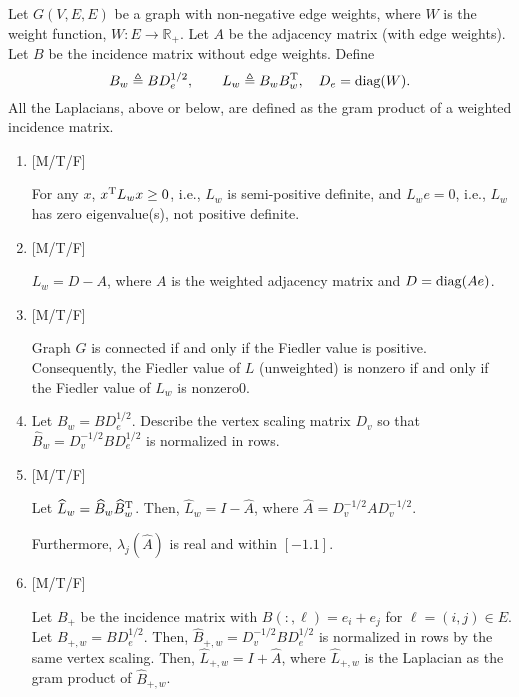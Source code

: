 \begin{enumerate}
     Let $G(V,E,E)$ be a graph with non-negative edge weights, where
     $W$ is the weight function, $W:E\to \mathbb{R}_{+}$.  Let $A$ be
     the adjacency matrix (with edge weights).  Let $B$ be the
     incidence matrix without edge weights.  Define
     \begin{equation}
       B_{w} \triangleq B D_{e}^{1/2},
       \qquad 
       L_{w} \triangleq B_{w} B_{w}^{\rm T},
       \quad 
       D_{e} = \mbox{diag}(W).
     \end{equation} 
     All the Laplacians, above or below, are defined as the gram
     product of a weighted incidence matrix.
     
     \begin{enumerate}
     \item { [M/T/F] }

       For any $x$, $x^{\rm T}L_{w}x\geq 0$, i.e., $L_{w}$ is
       semi-positive definite, and $L_{w}e=0$, i.e., $L_{w}$ has zero
       eigenvalue(s), not positive definite.
       

     \item { [M/T/F] }

       $L_{w} = D-A$, where
         $A$ is the weighted adjacency matrix and $D=\mbox{\rm
        diag}(Ae)$.

     
     \item { [M/T/F] }

       Graph $G$ is connected if and only if the Fiedler value is positive.
       Consequently, the Fiedler value of $L$ (unweighted) is nonzero
       if and only if the Fiedler value of $L_{w}$ is nonzero0.

     \item Let $B_{w} = BD_{e}^{1/2}$. Describe the vertex scaling
       matrix $D_{v}$ so that $\widehat{B}_{w} = D_v^{-1/2} BD_{e}^{1/2}$
       is normalized in rows.
       
     \item { [M/T/F] }

       Let
       $\widehat{L}_{w} = \widehat{B}_{w} \widehat{B}_{w}^{\rm T}$.
       Then, $\widehat{L}_{w} = I - \widehat{A}$, where
       $\widehat{A} = D_{v}^{-1/2} A D_{v}^{-1/2}$.

       Furthermore,
       $\lambda_{j}(\widehat{A})$ is real and within $[-1.1]$.
      
     \item { [M/T/F] }

       Let $B_{+}$ be the incidence matrix with $B(:,\ell) = e_i+e_j$
       for $\ell = (i,j) \in E$. Let $B_{+,w} = BD_{e}^{1/2} $. Then,
       $\widehat{B}_{+,w} = D_{v}^{-1/2}BD_{e}^{1/2} $ is normalized
       in rows by the same vertex scaling.  Then,
       $\widehat{L}_{+,w} = I + \widehat{A}$, where
       $\widehat{L}_{+,w}$ is the Laplacian as the gram product of
       $\widehat{B}_{+,w}$.
       

\end{enumerate}
\end{enumerate}
